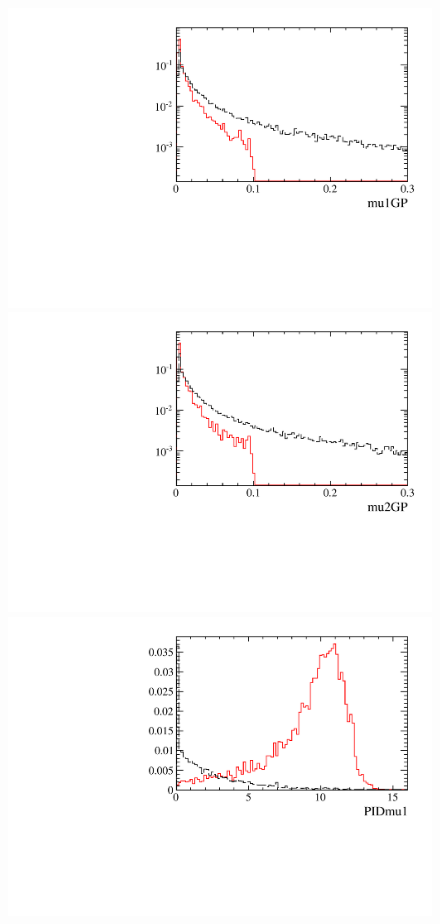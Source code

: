 \documentclass[12pt,a4paper]{article}
\begin{document}
\begin{figure} [htb!]
\begin{center}
\includegraphics[scale=0.20]{figs/mu1GPPARTIALptcut.pdf}
\includegraphics[scale=0.20]{figs/mu2GPPARTIALptcut.pdf}
\includegraphics[scale=0.20]{figs/PIDmu1PARTIALptcut.pdf}

\end{center}
\end{figure}
\end{document}
